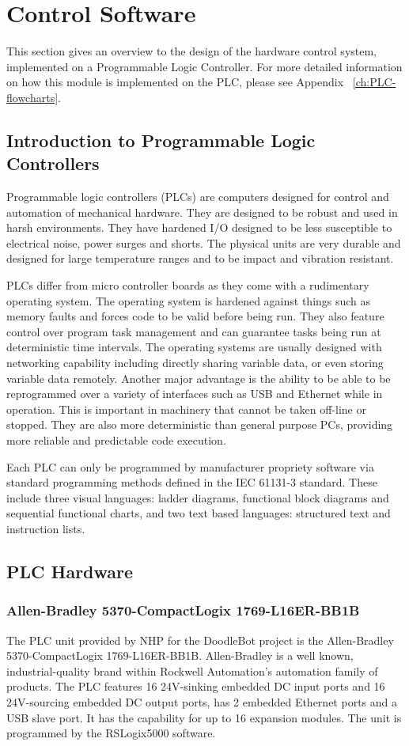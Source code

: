 \section{Control Software}

This section gives an overview to the design of the hardware control system, implemented on a Programmable Logic Controller. For more detailed information on how this module is implemented on the PLC, please see Appendix ~\ref{ch:PLC-flowcharts}.

\subsection{Introduction to Programmable Logic Controllers}
	Programmable logic controllers (PLCs) are computers designed for control and automation of mechanical hardware. They are designed to be robust and used in harsh environments. They have hardened I/O designed to be less susceptible to electrical noise, power surges and shorts. The physical units are very durable and designed for large temperature ranges and to be impact and vibration resistant.
	
	PLCs differ from micro controller boards as they come with a rudimentary operating system. The operating system is hardened against things such as memory faults and forces code to be valid before being run. They also feature control over program task management and can guarantee tasks being run at deterministic time intervals. The operating systems are usually designed with networking capability including directly sharing variable data, or even storing variable data remotely. Another major advantage is the ability to be able to be reprogrammed over a variety of interfaces such as USB and Ethernet while in operation. This is important in machinery that cannot be taken off-line or stopped. They are also more deterministic than general purpose PCs, providing more reliable and predictable code execution.
	
	Each PLC can only be programmed by manufacturer propriety software via standard programming methods defined in the IEC 61131-3 standard. These include three visual languages: ladder diagrams, functional block diagrams and sequential functional charts, and two text based languages: structured text and instruction lists.
	
\subsection{PLC Hardware}
	\subsubsection{Allen-Bradley 5370-CompactLogix 1769-L16ER-BB1B}
		The PLC unit provided by NHP for the DoodleBot project is the Allen-Bradley 5370-CompactLogix 1769-L16ER-BB1B. Allen-Bradley is a well known, industrial-quality brand within Rockwell Automation's automation family of products. The PLC features 16 24V-sinking embedded DC input ports and 16 24V-sourcing embedded DC output ports, has 2 embedded Ethernet ports and a USB slave port. It has the capability for up to 16 expansion modules. The unit is programmed by the RSLogix5000 software.
